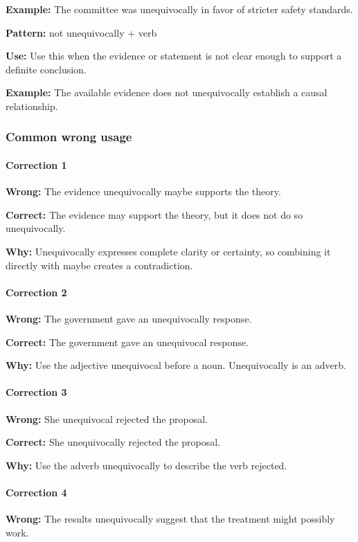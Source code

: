 \documentclass[11pt]{article}
\begin{document}
\textbf{Example:} The committee was unequivocally in favor of stricter safety standards.

\textbf{Pattern:} not unequivocally + verb

\textbf{Use:} Use this when the evidence or statement is not clear enough to support a definite conclusion.

\textbf{Example:} The available evidence does not unequivocally establish a causal relationship.

\subsubsection{Common wrong usage}
\paragraph{Correction 1}
\textbf{Wrong:} The evidence unequivocally maybe supports the theory.

\textbf{Correct:} The evidence may support the theory, but it does not do so unequivocally.

\textbf{Why:} Unequivocally expresses complete clarity or certainty, so combining it directly with maybe creates a contradiction.

\paragraph{Correction 2}
\textbf{Wrong:} The government gave an unequivocally response.

\textbf{Correct:} The government gave an unequivocal response.

\textbf{Why:} Use the adjective unequivocal before a noun. Unequivocally is an adverb.

\paragraph{Correction 3}
\textbf{Wrong:} She unequivocal rejected the proposal.

\textbf{Correct:} She unequivocally rejected the proposal.

\textbf{Why:} Use the adverb unequivocally to describe the verb rejected.

\paragraph{Correction 4}
\textbf{Wrong:} The results unequivocally suggest that the treatment might possibly work.
\end{document}
